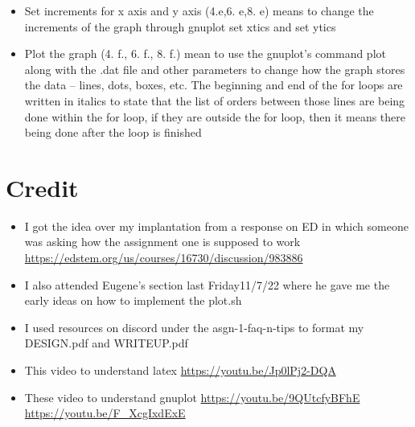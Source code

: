 \documentclass[11pt]{article} %
\begin{document}
\begin{flushleft}
\begin{itemize}
\begin{itemize}
    \item Set increments for x axis and y axis (4.e,6. e,8. e) means to change the increments of the graph through gnuplot set xtics and set ytics
    \item Plot the graph (4. f., 6. f., 8. f.) mean to use the gnuplot’s command plot along with the .dat file and other parameters to change how the graph stores the data – lines, dots, boxes, etc.
\scriptsize{ The beginning and end of the for loops are written in italics to state that the list of orders between those lines are being done within the for loop, if they are outside the for loop, then it means there being done after the loop is finished}

\end{itemize}
\end{itemize}
\end{flushleft}
\section{Credit}
\begin{itemize}
\item I got the idea over my implantation from a response on ED in which someone was asking how the assignment one is supposed to work \url{ https://edstem.org/us/courses/16730/discussion/983886}
\item I also attended Eugene’s section last Friday11/7/22 where he gave me the early ideas on how to implement the plot.sh
\item I used resources on discord under the asgn-1-faq-n-tips to format my DESIGN.pdf and WRITEUP.pdf
\item This video to understand latex \url{https://youtu.be/Jp0lPj2-DQA}
\item These video to understand gnuplot \url{https://youtu.be/9QUtcfyBFhE} \url{https://youtu.be/F_XcgIxdExE}
\end{itemize}
\end{document}
